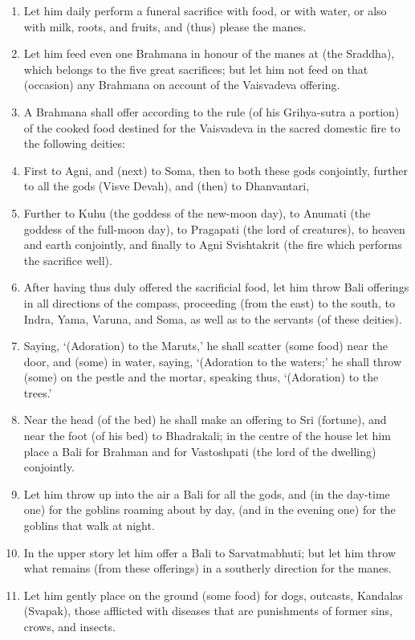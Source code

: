 \begin{enumerate}
\item Let him daily perform a funeral sacrifice with food, or with water, or also with milk, roots, and fruits, and (thus) please the manes.
\item Let him feed even one Brahmana in honour of the manes at (the Sraddha), which belongs to the five great sacrifices; but let him not feed on that (occasion) any Brahmana on account of the Vaisvadeva offering.
\item A Brahmana shall offer according to the rule (of his Grihya-sutra a portion) of the cooked food destined for the Vaisvadeva in the sacred domestic fire to the following deities:
\item First to Agni, and (next) to Soma, then to both these gods conjointly, further to all the gods (Visve Devah), and (then) to Dhanvantari,
\item Further to Kuhu (the goddess of the new-moon day), to Anumati (the goddess of the full-moon day), to Pragapati (the lord of creatures), to heaven and earth conjointly, and finally to Agni Svishtakrit (the fire which performs the sacrifice well).
\item After having thus duly offered the sacrificial food, let him throw Bali offerings in all directions of the compass, proceeding (from the east) to the south, to Indra, Yama, Varuna, and Soma, as well as to the servants (of these deities).
\item Saying, `(Adoration) to the Maruts,' he shall scatter (some food) near the door, and (some) in water, saying, `(Adoration to the waters;' he shall throw (some) on the pestle and the mortar, speaking thus, `(Adoration) to the trees.'
\item Near the head (of the bed) he shall make an offering to Sri (fortune), and near the foot (of his bed) to Bhadrakali; in the centre of the house let him place a Bali for Brahman and for Vastoshpati (the lord of the dwelling) conjointly.
\item Let him throw up into the air a Bali for all the gods, and (in the day-time one) for the goblins roaming about by day, (and in the evening one) for the goblins that walk at night.
\item In the upper story let him offer a Bali to Sarvatmabhuti; but let him throw what remains (from these offerings) in a southerly direction for the manes.
\item Let him gently place on the ground (some food) for dogs, outcasts, Kandalas (Svapak), those afflicted with diseases that are punishments of former sins, crows, and insects.

\end{enumerate}
